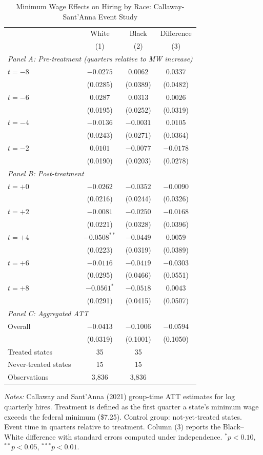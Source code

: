 \begin{table}[htbp]
\centering
\caption{Minimum Wage Effects on Hiring by Race: Callaway-Sant'Anna Event Study}
\label{tab:event_study}
\begin{tabular}{lccc}
\hline\hline
 & White & Black & Difference \\
 & (1) & (2) & (3) \\
\hline
\multicolumn{4}{l}{\textit{Panel A: Pre-treatment (quarters relative to MW increase)}} \\
$t = -8$ & $-0.0275$ & $0.0062$ & $0.0337$ \\
 & (0.0285) & (0.0389) & (0.0482) \\
$t = -6$ & $0.0287$ & $0.0313$ & $0.0026$ \\
 & (0.0195) & (0.0252) & (0.0319) \\
$t = -4$ & $-0.0136$ & $-0.0031$ & $0.0105$ \\
 & (0.0243) & (0.0271) & (0.0364) \\
$t = -2$ & $0.0101$ & $-0.0077$ & $-0.0178$ \\
 & (0.0190) & (0.0203) & (0.0278) \\
\hline
\multicolumn{4}{l}{\textit{Panel B: Post-treatment}} \\
$t = +0$ & $-0.0262$ & $-0.0352$ & $-0.0090$ \\
 & (0.0216) & (0.0244) & (0.0326) \\
$t = +2$ & $-0.0081$ & $-0.0250$ & $-0.0168$ \\
 & (0.0221) & (0.0328) & (0.0396) \\
$t = +4$ & $-0.0508^{**}$ & $-0.0449$ & $0.0059$ \\
 & (0.0223) & (0.0319) & (0.0389) \\
$t = +6$ & $-0.0116$ & $-0.0419$ & $-0.0303$ \\
 & (0.0295) & (0.0466) & (0.0551) \\
$t = +8$ & $-0.0561^{*}$ & $-0.0518$ & $0.0043$ \\
 & (0.0291) & (0.0415) & (0.0507) \\
\hline
\multicolumn{4}{l}{\textit{Panel C: Aggregated ATT}} \\
Overall & $-0.0413$ & $-0.1006$ & $-0.0594$ \\
 & (0.0319) & (0.1001) & (0.1050) \\
\hline
Treated states & 35 & 35 & \\
Never-treated states & 15 & 15 & \\
Observations & 3,836 & 3,836 & \\
\hline\hline
\end{tabular}
\begin{tablenotes}[flushleft]\small
\item \textit{Notes:} Callaway and Sant'Anna (2021) group-time ATT estimates for log quarterly hires. Treatment is defined as the first quarter a state's minimum wage exceeds the federal minimum (\$7.25). Control group: not-yet-treated states. Event time in quarters relative to treatment. Column (3) reports the Black--White difference with standard errors computed under independence. $^{*}p<0.10$, $^{**}p<0.05$, $^{***}p<0.01$.
\end{tablenotes}
\end{table}

